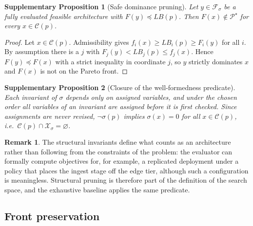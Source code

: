 \documentclass[preprint,11pt,3p]{elsarticle}
\theoremstyle{plain}
\newtheorem{proposition}{Supplementary Proposition}
\theoremstyle{definition}
\newtheorem{remark}{Remark}
\newcommand{\X}{\mathcal{X}}
\newcommand{\C}{\mathcal{C}}
\newcommand{\F}{\mathcal{F}}
\newcommand{\PS}{\mathcal{P}^{\star}}
\newcommand{\LB}{\mathit{LB}}
\begin{document}
\begin{proposition}[Safe dominance pruning]
\label{prop:s:dom}
Let $y\in\F_\sigma$ be a fully evaluated feasible architecture with $F(y)\preceq\LB(p)$.
Then $F(x)\notin\PS$ for every $x\in\C(p)$.
\end{proposition}
\begin{proof}
Let $x\in\C(p)$. Admissibility gives $f_i(x)\ge\LB_i(p)\ge F_i(y)$ for all $i$. By
assumption there is a $j$ with $F_j(y)<\LB_j(p)\le f_j(x)$. Hence $F(y)\preceq F(x)$ with
a strict inequality in coordinate $j$, so $y$ strictly dominates $x$ and $F(x)$ is not on
the Pareto front.
\end{proof}

\begin{proposition}[Closure of the well-formedness predicate]
\label{prop:s:struct}
Each invariant of $\sigma$ depends only on assigned variables, and under the chosen order
all variables of an invariant are assigned before it is first checked. Since assignments
are never revised, $\neg\sigma(p)$ implies $\sigma(x)=0$ for all $x\in\C(p)$, i.e.\
$\C(p)\cap\X_\sigma=\varnothing$.
\end{proposition}

\begin{remark}
The structural invariants define what counts as an architecture rather than following
from the constraints of the problem: the evaluator can formally compute objectives for,
for example, a replicated deployment under a policy that places the ingest stage off the
edge tier, although such a configuration is meaningless. Structural pruning is therefore
part of the definition of the search space, and the exhaustive baseline applies the same
predicate.
\end{remark}

\subsection*{Front preservation}
\end{document}
